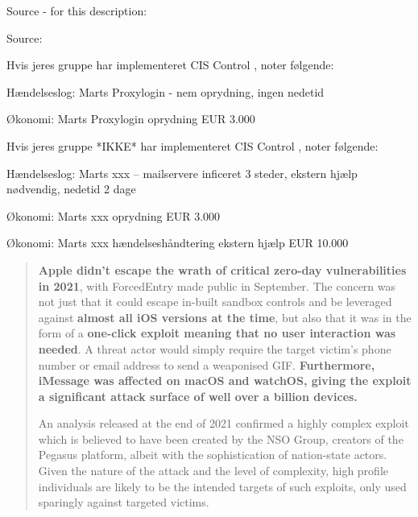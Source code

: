 \documentclass[Screen16to9,17pt]{foils}
\begin{document}
Source - for this description:\\


\begin{quote}

\end{quote}

Source:




Hvis jeres gruppe har implementeret CIS Control , noter følgende:
\begin{list2}
\item Hændelseslog: Marts Proxylogin - nem oprydning, ingen nedetid
\item Økonomi: Marts Proxylogin oprydning EUR 3.000
\end{list2}


Hvis jeres gruppe *IKKE* har implementeret CIS Control , noter følgende:
\begin{list2}
\item Hændelseslog: Marts xxx -- mailservere inficeret 3 steder, ekstern hjælp nødvendig, nedetid 2 dage
\item Økonomi: Marts xxx oprydning EUR 3.000
\item Økonomi: Marts xxx hændelseshåndtering ekstern hjælp EUR 10.000
\end{list2}





\begin{quote}
{\bf Apple didn’t escape the wrath of critical zero-day vulnerabilities in 2021}, with ForcedEntry made public in September. The concern was not just that it could escape in-built sandbox controls and be leveraged against {\bf almost all iOS versions at the time}, but also that it was in the form of a {\bf one-click exploit meaning that no user interaction was needed}. A threat actor would simply require the target victim’s phone number or email address to send a weaponised GIF. {\bf Furthermore, iMessage was affected on macOS and watchOS, giving the exploit a significant attack surface of well over a billion devices.}

An analysis released at the end of 2021 confirmed a highly complex exploit which is believed to have been created by the NSO Group, creators of the Pegasus platform, albeit with the sophistication of nation-state actors. Given the nature of the attack and the level of complexity, high profile individuals are likely to be the intended targets of such exploits, only used sparingly against targeted victims.
\end{quote}
\end{document}
